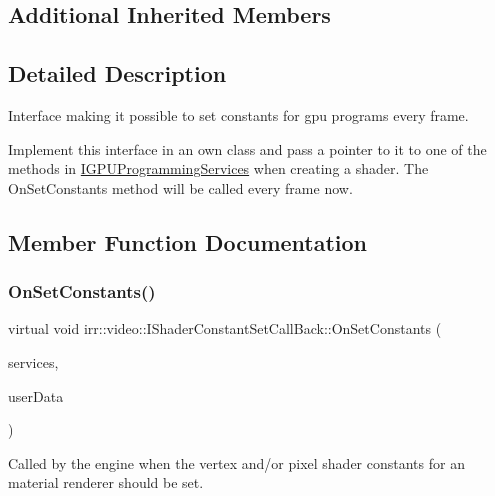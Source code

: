 \subsection*{Additional Inherited Members}


\subsection{Detailed Description}
Interface making it possible to set constants for gpu programs every frame. 

Implement this interface in an own class and pass a pointer to it to one of the methods in \hyperlink{classirr_1_1video_1_1IGPUProgrammingServices}{I\+G\+P\+U\+Programming\+Services} when creating a shader. The On\+Set\+Constants method will be called every frame now. 

\subsection{Member Function Documentation}
\mbox{\label{classirr_1_1video_1_1IShaderConstantSetCallBack_a91cf4eb8d20d278defaca4e3c9390396}} 
\subsubsection{\texorpdfstring{On\+Set\+Constants()}{OnSetConstants()}}
{\footnotesize\ttfamily virtual void irr\+::video\+::\+I\+Shader\+Constant\+Set\+Call\+Back\+::\+On\+Set\+Constants (\begin{DoxyParamCaption}\item[{\hyperlink{classirr_1_1video_1_1IMaterialRendererServices}{I\+Material\+Renderer\+Services} $\ast$}]{services,  }\item[{\hyperlink{namespaceirr_ac66849b7a6ed16e30ebede579f9b47c6}{s32}}]{user\+Data }\end{DoxyParamCaption})\hspace{0.3cm}{\ttfamily [pure virtual]}}



Called by the engine when the vertex and/or pixel shader constants for an material renderer should be set. 

